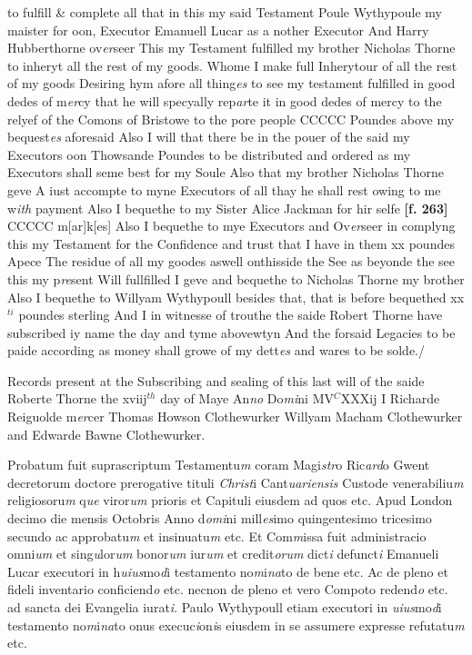 \documentclass[a4paper,12pt]{article}
\begin{document}
to fulfill \& complete all that in this my said Testament Poule Wythypoule my maister for oon, Executor Emanuell Lucar as a nother Executor And Harry Hubberthorne ov\textit{er}seer This my Testament fulfilled my brother Nicholas Thorne to inheryt all the rest of my goods. Whome I make full Inherytour of all the rest of my goods Desiring hym afore all thing\textit{es} to see my testament fulfilled in good dedes of m\textit{er}cy that he will specyally rep\textit{ar}te it in good dedes of mercy to the relyef of the Comons of Bristowe to the pore people CCCCC Poundes above my bequest\textit{es} aforesaid Also I will that there be in the pouer of the said my Executors oon Thowsande Poundes to be distributed and ordered as my Executors shall seme best for my Soule Also that my brother Nicholas Thorne geve A iust accompte to myne Executors of all thay he shall rest owing to me w\textit{ith} payment Also I bequethe to my Sister Alice Jackman for hir selfe \textbf{[f. 263]} CCCCC m[ar]k[es] Also I bequethe to mye Executors and Ov\textit{er}seer in complyng this my Testament for the Confidence and trust that I have in them xx poundes Apece The residue of all my goodes aswell onthisside the See as beyonde the see this my p\textit{re}sent Will fullfilled I geve and bequethe to Nicholas Thorne my brother Also I bequethe to Willyam Wythypoull besides that, that is before bequethed xx$^{ti}$ poundes sterling And I in witnesse of trouthe the saide Robert Thorne have subscribed iy name the day and tyme abovewtyn And the forsaid Legacies to be paide according as money shall growe of my dett\textit{es} and wares to be solde./

Records present at the Subscribing and sealing of this last will of the saide Roberte Thorne the xviij$^{th}$ day of Maye An\textit{no} Do\textit{mi}ni MV$^{C}$XXXij I Richarde Reiguolde m\textit{er}cer Thomas Howson Clothewurker Willyam Macham Clothewurker and Edwarde Bawne Clothewurker.

\begin{sloppypar}Probatum fuit suprascriptum Testamentu\textit{m} coram Magi\textit{str}o Ric\textit{ard}o Gwent decretorum doctore prerogative tituli \textit{Christ}i Cant\textit{uariensis} Custode venerabiliu\textit{m} religiosoru\textit{m} q\textit{ue} viror\textit{um} prioris et Capituli eiusdem ad quos etc. Apud London decimo die mensis Octobris Anno d\textit{omi}ni mill\textit{es}imo quingentesimo tricesimo secundo ac approbatu\textit{m} et insinuatu\textit{m} etc. Et Com\textit{m}issa fuit administracio omni\textit{um} et sing\textit{u}lor\textit{um} bonor\textit{um} iur\textit{um} et credit\textit{orum} dict\textit{i} defunct\textit{i} Emanueli Lucar executori in h\textit{uius}mo\textit{d}i testamento no\textit{m}i\textit{na}to de bene etc. Ac de pleno et fideli inventario conficiend\textit{o} etc. necnon de pleno et vero Compoto redend\textit{o} etc. ad sancta dei Evangelia iurat\textit{i}. Paulo Wythypoull etiam executori in \textit{uius}mo\textit{d}i testamento no\textit{m}i\textit{na}to onus execuc\textit{i}on\textit{i}s eiusdem in se assumere expresse refutatu\textit{m} etc.\end{sloppypar}
\end{document}
